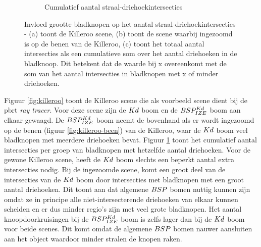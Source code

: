 \begin{figure}
\begin{subfigure}{0.5\textwidth}
        \caption{Cumulatief aantal straal-driehoekintersecties}
        \label{fig:voorbeeld-cumul}
    \end{subfigure}
    \label{fig:voorbeeld-bladknopen}
    \caption[Invloed grootte bladknopen op het aantal straal-driehoekintersecties]{Invloed grootte bladknopen op het aantal straal-driehoekintersecties - \small (a) toont de Killeroo scene, (b) toont de scene waarbij ingezoomd is op de benen van de Killeroo, (c) toont het totaal aantal intersecties als een cumulatieve som over het aantal driehoeken in de bladknoop. Dit betekent dat de waarde bij x overeenkomt met de som van het aantal intersecties in bladknopen met x of minder driehoeken.}
\end{figure}
Figuur \ref{fig:killeroo} toont de Killeroo scene die als voorbeeld scene dient bij de pbrt \cite{pbrt} \textit{ray tracer}.
Voor deze scene zijn de $Kd$ boom en de $BSP^{Kd}_{IZE}$ boom aan elkaar gewaagd.
De $BSP^{Kd}_{IZE}$ boom neemt de bovenhand als er wordt ingezoomd op de benen (figuur \ref{fig:killeroo-been}) van de Killeroo, waar de $Kd$ boom veel bladknopen met meerdere driehoeken bevat.
Figuur \ref{fig:voorbeeld-cumul} toont het cumulatief aantal intersecties per groep van bladknopen met hetzelfde aantal driehoeken.
Voor de gewone Killeroo scene, heeft de $Kd$ boom slechts een beperkt aantal extra intersecties nodig.
Bij de ingezoomde scene, komt een groot deel van de intersecties van de $Kd$ boom door intersecties met bladknopen met een groot aantal driehoeken.
Dit toont aan dat algemene $BSP$ bomen nuttig kunnen zijn omdat ze in principe alle niet-intersecterende driehoeken van elkaar kunnen scheiden en er dus minder regio's zijn met veel grote bladknopen.
Het aantal knoopdoorkruisingen bij de $BSP^{Kd}_{IZE}$ boom is zelfs lager dan bij de $Kd$ boom voor beide scenes.
Dit komt omdat de algemene $BSP$ bomen nauwer aansluiten aan het object waardoor minder stralen de knopen raken.\\

